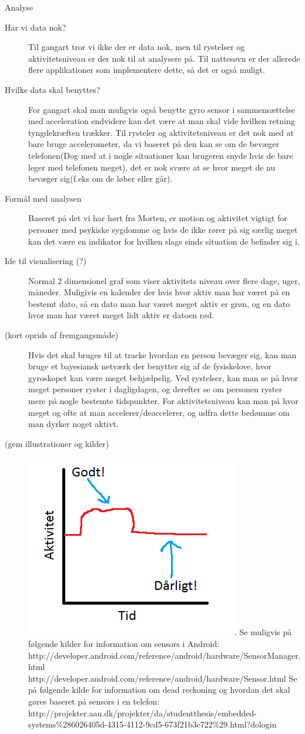 Analyse
\begin{description}
\item[Har vi data nok?] Til gangart tror vi ikke der er data nok, men til rystelser og aktivitetsniveau er der nok til at analysere på. Til nattesøvn er der allerede flere applikationer som implementere dette, så det er også muligt.
\item[Hvilke data skal benyttes?] For gangart skal man muligvis også benytte gyro sensor i sammensættelse med acceleration endvidere kan det være at man skal vide hvilken retning tyngdekræften trækker. Til rysteler og aktivitetsniveau er det nok med at bare bruge accelerometer, da vi baseret på den kan se om de bevæger telefonen(Dog med at i nogle situationer kan brugeren snyde hvis de bare leger med telefonen meget), det er nok svære at se hvor meget de nu bevæger sig(f.eks om de løber eller går). 
\item[Formål med analysen] Baseret på det vi har hørt fra Morten, er motion og aktivitet vigtigt for personer med psykiske sygdomme og hvis de ikke rører på sig særlig meget kan det være en indikator for hvilken slags sinds situation de befinder sig i.
\item[Ide til visualisering (?)] Normal 2 dimensionel graf som viser aktivitets niveau over flere dage, uger, måneder. Muligivis en kalender der hvis hvor aktiv man har været på en bestemt dato, så en dato man har været meget aktiv er grøn, og en dato hvor man har været meget lidt aktiv er datoen rød.
\item[(kort oprids af fremgangsmåde)] Hvis det skal bruges til at tracke hvordan en person bevæger sig, kan man bruge et bayesiansk netværk der benytter sig af de fysiskelove, hvor gyroskopet kan være meget behjælpelig. Ved rystelser, kan man se på hvor meget personer ryster i dagligdagen, og derefter se om personen ryster mere på nogle bestemte tidspunkter. For aktivitetsniveau kan man på hvor meget og ofte at man accelerer/deaccelerer, og udfra dette bedømme om man dyrker noget aktivt.
\item[(gem illustrationer og kilder)] \includegraphics{aktivitet_billed}. Se muligvis på følgende kilder for information om sensors i Android: http://developer.android.com/reference/android/hardware/SensorManager.html http://developer.android.com/reference/android/hardware/Sensor.html 
Se på følgende kilde for information om dead reckoning og hvordan det skal gøres baseret på sensors i en telefon: http://projekter.aau.dk/projekter/da/studentthesis/embedded-systems\%286026405d-4315-4112-9cd5-673f21b3c722\%29.html?dologin 
\end{description}